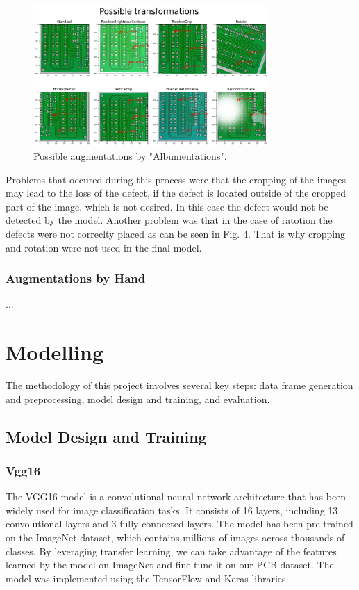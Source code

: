 \documentclass[12pt]{article}
\begin{document}
\begin{figure}[h]
    \centering
    \includegraphics[width=0.8\textwidth]{./graphics/5.png}
    \caption{Possible augmentations by "Albumentations".}
\end{figure}

Problems that occured during this process were that the cropping of the images may lead to the loss of the defect, if the defect is located outside of the cropped part of the image, which is not desired.
In this case the defect would not be detected by the model. Another problem was that in the case of ratotion the defects were not correclty placed as can be seen in Fig. 4. That is why
cropping and rotation were not used in the final model.

\subsubsection{Augmentations by Hand}

...

\section{Modelling}
The methodology of this project involves several key steps: data frame generation and preprocessing, model design and training, and evaluation.


\subsection{Model Design and Training}

\subsubsection{Vgg16}

The VGG16 model is a convolutional neural network architecture that has been widely used for image classification tasks. It consists of 16 layers, including 13 convolutional layers and 3 fully connected layers. The model has been pre-trained on the ImageNet dataset, which contains millions of images across thousands of classes. By leveraging transfer learning, we can take advantage of the features learned by the model on ImageNet and fine-tune it on our PCB dataset.
The model was implemented using the TensorFlow and Keras libraries. 
\end{document}
